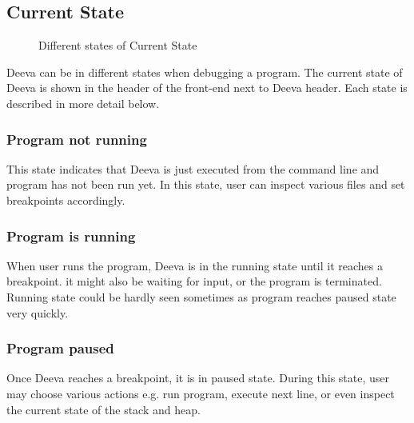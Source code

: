 \documentclass[11pt, a4paper]{article}
\begin{document}
\subsection{Current State}
\begin{figure}[h!]
\centering
{}
\quad
{}
\caption{Different states of Current State}
\label{fig:stateFeature}
\end{figure}
Deeva can be in different states when debugging a program. The current state of Deeva is shown in the header of the front-end next to Deeva header. Each state is described in more detail below.
\subsubsection{Program not running}
This state indicates that Deeva is just executed from the command line and program has not been run yet. In this state, user can inspect various files and set breakpoints accordingly. 
\subsubsection{Program is running}
When user runs the program, Deeva is in the running state until it reaches a breakpoint. 
it might also be waiting for input, or the program is terminated.
Running state could be hardly seen sometimes as program reaches paused state very quickly.
\subsubsection{Program paused}
Once Deeva reaches a breakpoint, it is in paused state. During this state, user may choose various actions e.g. run program, execute next line, or even inspect the current state of the stack and heap.
\end{document}
